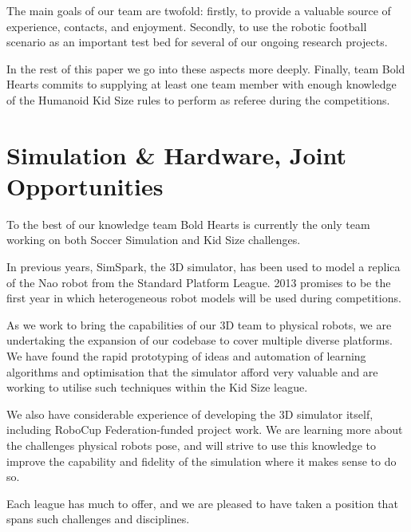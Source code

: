 \documentclass{llncs}
\begin{document}
The main goals of our team are twofold: firstly, to provide a
valuable source of experience, contacts, and enjoyment.
Secondly, to use the robotic football scenario as an important
test bed for several of our ongoing research projects.

In the rest of this paper we go into these aspects more
deeply. Finally, team Bold Hearts commits to supplying at least one
team member with enough knowledge of the Humanoid Kid Size rules to
perform as referee during the competitions.

\section{Simulation \& Hardware, Joint Opportunities}
\label{sec:simul-amp-hardw}

To the best of our knowledge team Bold Hearts is currently the only team
working on both Soccer Simulation and Kid Size challenges.

In previous years, SimSpark, the 3D simulator, has been used to model
a replica of the Nao robot from the Standard Platform League. 2013
promises to be the first year in which heterogeneous robot models
will be used during competitions.

As we work to bring the capabilities of our 3D team to physical robots,
we are undertaking the expansion of our codebase to cover multiple diverse platforms.
We have found the rapid prototyping of ideas and automation of learning algorithms and
optimisation that the simulator afford very valuable and are working
to utilise such techniques within the Kid Size league.

We also have considerable experience of developing the
3D simulator itself, including RoboCup Federation-funded
project work. We are learning more about the challenges physical
robots pose, and will strive to use this knowledge to improve the
capability and fidelity of the simulation where it makes sense to do so.

Each league has much to offer, and we are pleased to have taken a
position that spans such challenges and disciplines.

\end{document}
